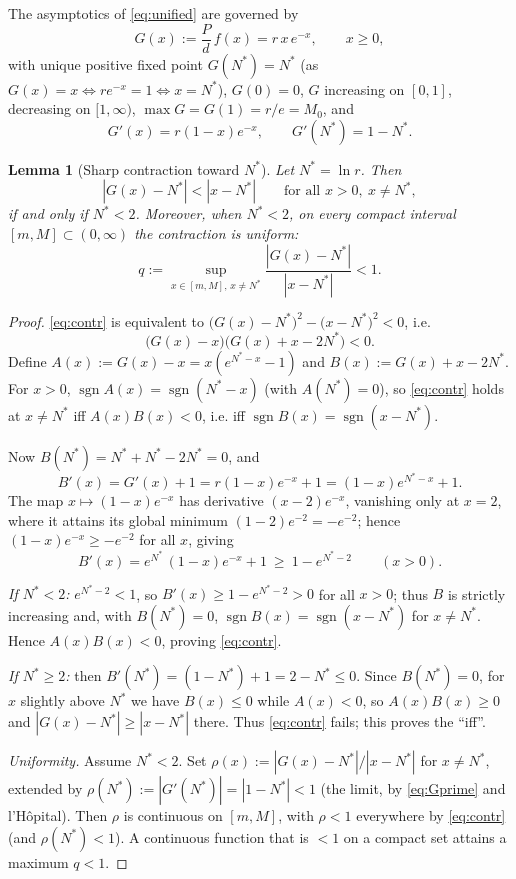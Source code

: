\documentclass[12pt]{article}
\newtheorem{lemma}{Lemma}
\theoremstyle{definition}
\begin{document}
The asymptotics of \eqref{eq:unified} are governed by
\begin{equation}\label{eq:G}
  G(x):=\frac{P}{d}\,f(x)=r\,x\,e^{-x},\qquad x\ge0 ,
\end{equation}
with unique positive fixed point $G(N^*)=N^*$ (as $G(x)=x\iff re^{-x}=1\iff
x=N^*$), $G(0)=0$, $G$ increasing on $[0,1]$, decreasing on $[1,\infty)$,
$\max G=G(1)=r/e=M_0$, and
\begin{equation}\label{eq:Gprime}
  G'(x)=r(1-x)e^{-x},\qquad G'(N^*)=1-N^* .
\end{equation}

\begin{lemma}[Sharp contraction toward $N^*$]\label{lem:contr}
Let $N^*=\ln r$. Then
\begin{equation}\label{eq:contr}
  |G(x)-N^*|<|x-N^*|\qquad\text{for all }x>0,\ x\ne N^*,
\end{equation}
\emph{if and only if} $N^*<2$. Moreover, when $N^*<2$, on every compact
interval $[m,M]\subset(0,\infty)$ the contraction is uniform:
\[
  q:=\sup_{x\in[m,M],\,x\ne N^*}\frac{|G(x)-N^*|}{|x-N^*|}<1 .
\]
\end{lemma}

\begin{proof}
\eqref{eq:contr} is equivalent to
$\bigl(G(x)-N^*\bigr)^2-\bigl(x-N^*\bigr)^2<0$, i.e.
\[
  \bigl(G(x)-x\bigr)\bigl(G(x)+x-2N^*\bigr)<0 .
\]
Define $A(x):=G(x)-x=x(e^{N^*-x}-1)$ and $B(x):=G(x)+x-2N^*$. For $x>0$,
$\operatorname{sgn}A(x)=\operatorname{sgn}(N^*-x)$ (with $A(N^*)=0$), so
\eqref{eq:contr} holds at $x\ne N^*$ iff $A(x)B(x)<0$, i.e. iff
$\operatorname{sgn}B(x)=\operatorname{sgn}(x-N^*)$.

Now $B(N^*)=N^*+N^*-2N^*=0$, and
\[
  B'(x)=G'(x)+1=r(1-x)e^{-x}+1=(1-x)e^{N^*-x}+1 .
\]
The map $x\mapsto(1-x)e^{-x}$ has derivative $(x-2)e^{-x}$, vanishing only at
$x=2$, where it attains its global minimum $(1-2)e^{-2}=-e^{-2}$; hence
$(1-x)e^{-x}\ge -e^{-2}$ for all $x$, giving
\begin{equation}\label{eq:Bplow}
  B'(x)=e^{N^*}\,(1-x)e^{-x}+1\ \ge\ 1-e^{N^*-2}\qquad(x>0).
\end{equation}

\emph{If $N^*<2$:} $e^{N^*-2}<1$, so $B'(x)\ge 1-e^{N^*-2}>0$ for all $x>0$;
thus $B$ is strictly increasing and, with $B(N^*)=0$,
$\operatorname{sgn}B(x)=\operatorname{sgn}(x-N^*)$ for $x\ne N^*$. Hence
$A(x)B(x)<0$, proving \eqref{eq:contr}.

\emph{If $N^*\ge2$:} then $B'(N^*)=(1-N^*)+1=2-N^*\le0$. Since $B(N^*)=0$, for
$x$ slightly above $N^*$ we have $B(x)\le0$ while $A(x)<0$, so $A(x)B(x)\ge0$
and $|G(x)-N^*|\ge|x-N^*|$ there. Thus \eqref{eq:contr} fails; this proves the
``iff''.

\emph{Uniformity.} Assume $N^*<2$. Set $\rho(x):=|G(x)-N^*|/|x-N^*|$ for
$x\ne N^*$, extended by $\rho(N^*):=|G'(N^*)|=|1-N^*|<1$ (the limit, by
\eqref{eq:Gprime} and l'Hôpital). Then $\rho$ is continuous on $[m,M]$, with
$\rho<1$ everywhere by \eqref{eq:contr} (and $\rho(N^*)<1$). A continuous
function that is $<1$ on a compact set attains a maximum $q<1$.
\end{proof}
\end{document}
